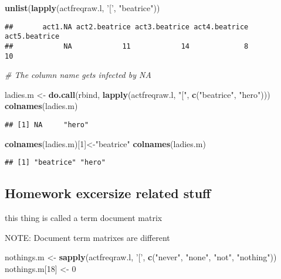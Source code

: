 \documentclass[
]{article}
\newenvironment{Shaded}{\begin{snugshade}}{\end{snugshade}}
\newcommand{\CommentTok}[1]{\textcolor[rgb]{0.56,0.35,0.01}{\textit{#1}}}
\newcommand{\DecValTok}[1]{\textcolor[rgb]{0.00,0.00,0.81}{#1}}
\newcommand{\KeywordTok}[1]{\textcolor[rgb]{0.13,0.29,0.53}{\textbf{#1}}}
\newcommand{\NormalTok}[1]{#1}
\newcommand{\StringTok}[1]{\textcolor[rgb]{0.31,0.60,0.02}{#1}}
\begin{document}
\begin{Shaded}
\begin{Highlighting}[]
\KeywordTok{unlist}\NormalTok{(}\KeywordTok{lapply}\NormalTok{(actfreqraw.l, }\StringTok{'['}\NormalTok{, }\StringTok{"beatrice"}\NormalTok{))}
\end{Highlighting}
\end{Shaded}

\begin{verbatim}
##       act1.NA act2.beatrice act3.beatrice act4.beatrice act5.beatrice 
##            NA            11            14             8            10
\end{verbatim}

\begin{Shaded}
\begin{Highlighting}[]
\CommentTok{# The column name gets infected by NA}

\NormalTok{ladies.m <-}\StringTok{ }\KeywordTok{do.call}\NormalTok{(rbind, }\KeywordTok{lapply}\NormalTok{(actfreqraw.l, }\StringTok{"["}\NormalTok{, }\KeywordTok{c}\NormalTok{(}\StringTok{"beatrice"}\NormalTok{, }\StringTok{"hero"}\NormalTok{)))}
\KeywordTok{colnames}\NormalTok{(ladies.m)}
\end{Highlighting}
\end{Shaded}

\begin{verbatim}
## [1] NA     "hero"
\end{verbatim}

\begin{Shaded}
\begin{Highlighting}[]
\KeywordTok{colnames}\NormalTok{(ladies.m)[}\DecValTok{1}\NormalTok{]<-}\StringTok{"beatrice"}
\KeywordTok{colnames}\NormalTok{(ladies.m)}
\end{Highlighting}
\end{Shaded}

\begin{verbatim}
## [1] "beatrice" "hero"
\end{verbatim}

\hypertarget{homework-excersize-related-stuff}{%
\subsection{Homework excersize related
stuff}\label{homework-excersize-related-stuff}}

this thing is called a term document matrix

NOTE: Document term matrixes are different

\begin{Shaded}
\begin{Highlighting}[]
\NormalTok{nothings.m <-}\StringTok{ }\KeywordTok{sapply}\NormalTok{(actfreqraw.l, }\StringTok{'['}\NormalTok{, }\KeywordTok{c}\NormalTok{(}\StringTok{"never"}\NormalTok{, }\StringTok{"none"}\NormalTok{, }\StringTok{"not"}\NormalTok{, }\StringTok{"nothing"}\NormalTok{))}
\NormalTok{nothings.m[}\DecValTok{18}\NormalTok{] <-}\StringTok{ }\DecValTok{0}
\end{Highlighting}
\end{Shaded}
\end{document}
